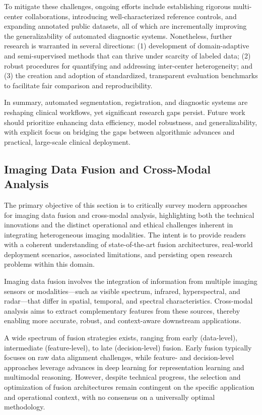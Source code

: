 \documentclass[sigconf]{acmart}
\begin{document}
To mitigate these challenges, ongoing efforts include establishing rigorous multi-center collaborations, introducing well-characterized reference controls, and expanding annotated public datasets, all of which are incrementally improving the generalizability of automated diagnostic systems. Nonetheless, further research is warranted in several directions: (1) development of domain-adaptive and semi-supervised methods that can thrive under scarcity of labeled data; (2) robust procedures for quantifying and addressing inter-center heterogeneity; and (3) the creation and adoption of standardized, transparent evaluation benchmarks to facilitate fair comparison and reproducibility.

In summary, automated segmentation, registration, and diagnostic systems are reshaping clinical workflows, yet significant research gaps persist. Future work should prioritize enhancing data efficiency, model robustness, and generalizability, with explicit focus on bridging the gaps between algorithmic advances and practical, large-scale clinical deployment.

\subsection{Imaging Data Fusion and Cross-Modal Analysis}

The primary objective of this section is to critically survey modern approaches for imaging data fusion and cross-modal analysis, highlighting both the technical innovations and the distinct operational and ethical challenges inherent in integrating heterogeneous imaging modalities. The intent is to provide readers with a coherent understanding of state-of-the-art fusion architectures, real-world deployment scenarios, associated limitations, and persisting open research problems within this domain.

Imaging data fusion involves the integration of information from multiple imaging sensors or modalities—such as visible spectrum, infrared, hyperspectral, and radar—that differ in spatial, temporal, and spectral characteristics. Cross-modal analysis aims to extract complementary features from these sources, thereby enabling more accurate, robust, and context-aware downstream applications.

A wide spectrum of fusion strategies exists, ranging from early (data-level), intermediate (feature-level), to late (decision-level) fusion. Early fusion typically focuses on raw data alignment challenges, while feature- and decision-level approaches leverage advances in deep learning for representation learning and multimodal reasoning. However, despite technical progress, the selection and optimization of fusion architectures remain contingent on the specific application and operational context, with no consensus on a universally optimal methodology.
\end{document}

